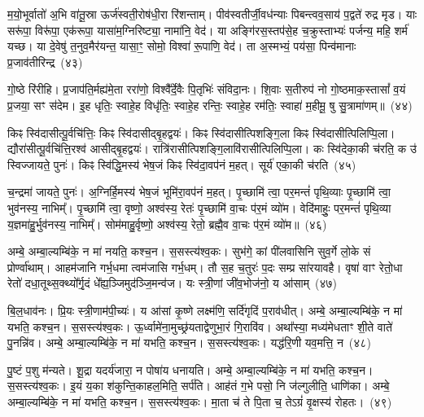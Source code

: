 {\anuvakamend[{नम॒ एका॒न्नत्रि॒ꣳ॒शत्}]}%

म॒यो॒भूर्वातो॑ अ॒भि वा॑तू॒स्रा ऊर्ज॑स्वती॒रोष॑धी॒रा रि॑शन्ताम्। पीव॑स्वतीर्जी॒वध॑न्याः पिबन्त्वव॒साय॑ प॒द्वते॑ रुद्र मृड। याः सरू॑पा॒ विरू॑पा॒ एक॑रूपा॒ यासा॑म॒ग्निरिष्ट्या॒ नामा॑नि॒ वेद॑। या अङ्गि॑रस॒स्तप॑से॒ह च॒क्रुस्ताभ्यः॑ पर्जन्य॒ महि॒ शर्म॑ यच्छ। या दे॒वेषु॑ त॒नुव॒मैर॑यन्त॒ यासा॒ꣳ॒ सोमो॒ विश्वा॑ रू॒पाणि॒ वेद॑। ता अ॒स्मभ्यं॒ पय॑सा॒ पिन्व॑मानाः प्र॒जाव॑तीरिन्द्र~(४३)

गो॒ष्ठे रि॑रीहि। प्र॒जा\-प॑ति॒र्मह्य॑मे॒ता ररा॑णो॒ विश्वै᳚र्दे॒वैः पि॒तृभिः॑ संविदा॒नः। शि॒वाः स॒तीरुप॑ नो गो॒ष्ठमाक॒स्तासां᳚ व॒यं प्र॒जया॒ सꣳ स॑देम। इ॒ह धृतिः॒ स्वाहे॒ह विधृ॑तिः॒ स्वाहे॒ह रन्तिः॒ स्वाहे॒ह रम॑तिः॒ स्वाहा॑ म॒हीमू॒ षु सु॒त्रामा॑णम्॥~(४४)

{\anuvakamend[{इ॒न्द्रा॒ष्टात्रिꣳ॑शच्च}]}%

किꣴ स्वि॑दासीत्पू॒र्वचि॑त्तिः॒ किꣴ स्वि॑दासीद्बृ॒हद्वयः॑। किꣴ स्वि॑दासीत्पिशङ्गि॒ला किꣴ स्वि॑दासीत्पिलिप्पि॒ला। द्यौरा॑सीत्पू॒र्वचि॑त्ति॒रश्व॑ आसीद्बृ॒हद्वयः॑। रात्रि॑रासीत्पिशङ्गि॒लावि॑रासीत्पिलिप्पि॒ला। कः स्वि॑देका॒की च॑रति॒ क उ॑ स्विज्जायते॒ पुनः॑। किꣴ स्वि॑द्धि॒मस्य॑ भेष॒जं किꣴ स्वि॑दा॒वप॑नं म॒हत्। सूर्य॑ एका॒की च॑रति~(४५)

च॒न्द्रमा॑ जायते॒ पुनः॑। अ॒ग्निर्\mbox{}हि॒मस्य॑ भेष॒जं भूमि॑रा॒वप॑नं म॒हत्। पृ॒च्छामि॑ त्वा॒ पर॒मन्तं॑ पृथि॒व्याः पृ॒च्छामि॑ त्वा॒ भुव॑नस्य॒ नाभिम्᳚। पृ॒च्छामि॑ त्वा॒ वृष्णो॒ अश्व॑स्य॒ रेतः॑ पृ॒च्छामि॑ वा॒चः प॑र॒मं व्यो॑म। वेदि॑माहुः॒ पर॒मन्तं॑ पृथि॒व्या य॒ज्ञमा॑हु॒र्भुव॑नस्य॒ नाभिम्᳚। सोम॑माहु॒र्वृष्णो॒ अश्व॑स्य॒ रेतो॒ ब्रह्मै॒व वा॒चः प॑र॒मं व्यो॑म॥~(४६)

{\anuvakamend[{सूर्य॑ एका॒की च॑रति॒ षट्च॑त्वारिꣳशच्च}]}%

अम्बे॒ अम्बा॒ल्यम्बि॑के॒ न मा॑ नयति॒ कश्च॒न। स॒सस्त्य॑श्व॒कः। सुभ॑गे॒ कां पी॑लवासिनि सुव॒र्गे लो॒के सं प्रोर्ण्वा॑थाम्। आहम॑जानि गर्भ॒धमा त्वम॑जासि गर्भ॒धम्। तौ स॒ह च॒तुरः॑ प॒दः सम्प्र सा॑रयावहै। वृषा॑ वाꣳ रेतो॒धा रेतो॑ दधा॒तूथ्स॒क्थ्यो᳚र्गृ॒दं धे᳚ह्य॒ञ्जिमुद॑ञ्जि॒मन्व॑ज। यः स्त्री॒णां जी॑व॒भोज॑नो॒ य आ॑साम्~(४७)

बि॒ल॒धाव॑नः। प्रि॒यः स्त्री॒णाम॑पी॒च्यः॑। य आ॑सां कृ॒ष्णे लक्ष्म॑णि॒ सर्दि॑गृदिं प॒राव॑धीत्। अम्बे॒ अम्बा॒ल्यम्बि॑के॒ न मा॑ यभति॒ कश्च॒न। स॒सस्त्य॑श्व॒कः। ऊ॒र्ध्वामे॑ना॒मुच्छ्र॑यताद्वेणुभा॒रं गि॒रावि॑व। अथा᳚स्या॒ मध्य॑मेधताꣳ शी॒ते वाते॑ पु॒नन्नि॑व। अम्बे॒ अम्बा॒ल्यम्बि॑के॒ न मा॑ यभति॒ कश्च॒न। स॒सस्त्य॑श्व॒कः। यद्ध॑रि॒णी यव॒मत्ति॒ न~(४८)

पु॒ष्टं प॒शु म॑न्यते। शू॒द्रा यदर्य॑जारा॒ न पोषा॑य धनायति। अम्बे॒ अम्बा॒ल्यम्बि॑के॒ न मा॑ यभति॒ कश्च॒न। स॒सस्त्य॑श्व॒कः। इ॒यं य॒का श॑कुन्ति॒काहल॒मिति॒ सर्प॑ति। आह॑तं ग॒भे पसो॒ नि ज॑ल्गुलीति॒ धाणि॑का। अम्बे॒ अम्बा॒ल्यम्बि॑के॒ न मा॑ यभति॒ कश्च॒न। स॒सस्त्य॑श्व॒कः। मा॒ता च॑ ते पि॒ता च॒ ते\-ऽग्रं॑ वृ॒क्षस्य॑ रोहतः।~(४९)

